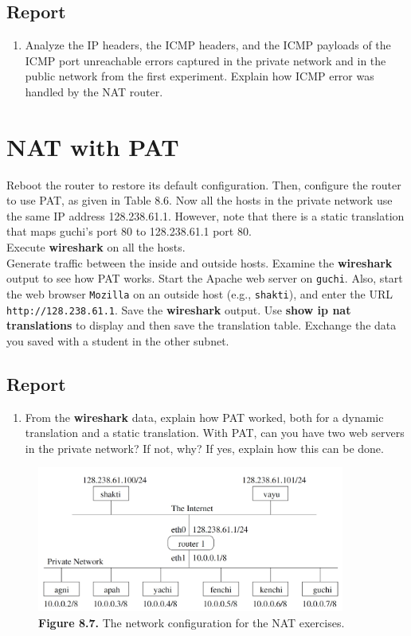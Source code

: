 \documentclass[10pt,a4paper]{article}
\numberwithin{equation}{section}
\numberwithin{figure}{section}
\numberwithin{table}{section}
\begin{document}
    \subsection*{Report}
    \begin{enumerate}
        \item Analyze the IP headers, the ICMP headers, and the ICMP payloads of the ICMP port unreachable errors captured in the private network and in the public network from the first experiment.
        Explain how ICMP error was handled by the NAT router.
    \end{enumerate}

    \section*{NAT with PAT}
    Reboot the router to restore its default configuration.
    Then, configure the router to use PAT, as given in Table 8.6. Now all the hosts in the private network use the same IP address 128.238.61.1. However, note that there is a static translation that maps guchi’s port 80 to 128.238.61.1 port 80. \\
    Execute \textbf{wireshark} on all the hosts. \\
    Generate traffic between the inside and outside hosts.
    Examine the \textbf{wireshark} output to see how PAT works.
    Start the Apache web server on \texttt{guchi}. Also, start the web browser \texttt{Mozilla} on an outside host (e.g., \texttt{shakti}), and enter the URL \texttt{http://128.238.61.1}. Save the \textbf{wireshark} output.
    Use \textbf{show ip nat translations} to display and then save the translation table.
    Exchange the data you saved with a student in the other subnet.
    \subsection*{Report}
    \begin{enumerate}
        \item From the \textbf{wireshark} data, explain how PAT worked, both for a dynamic translation and a static translation.
        With PAT, can you have two web servers in the private network?
        If not, why?
        If yes, explain how this can be done.
    \end{enumerate}
    
    \begin{figure}[H]
        \centering
        \includegraphics[width=0.9\textwidth]{img/fig1.png}
        \caption{\textbf{Figure 8.7.} The network configuration for the NAT exercises.}
        \label{fig:8.7}
    \end{figure}
\end{document}
